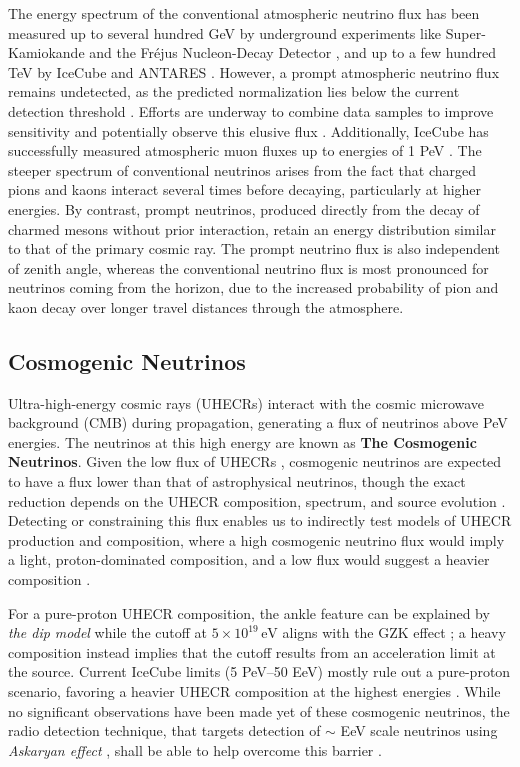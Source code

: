 The energy spectrum of the conventional atmospheric neutrino flux has been measured up to several hundred GeV by underground experiments like Super-Kamiokande  and the Fréjus Nucleon-Decay Detector , and up to a few hundred TeV by IceCube  and ANTARES . However, a prompt atmospheric neutrino flux remains undetected, as the predicted normalization lies below the current detection threshold . Efforts are underway to combine data samples to improve sensitivity and potentially observe this elusive flux . Additionally, IceCube has successfully measured atmospheric muon fluxes up to energies of 1 PeV . The steeper spectrum of conventional neutrinos arises from the fact that charged pions and kaons interact several times before decaying, particularly at higher energies. By contrast, prompt neutrinos, produced directly from the decay of charmed mesons without prior interaction, retain an energy distribution similar to that of the primary cosmic ray. The prompt neutrino flux is also independent of zenith angle, whereas the conventional neutrino flux is most pronounced for neutrinos coming from the horizon, due to the increased probability of pion and kaon decay over longer travel distances through the atmosphere.


\subsection{Cosmogenic Neutrinos}
\label{sec:cosmogenic_nu}
Ultra-high-energy cosmic rays (UHECRs) interact with the cosmic microwave background (CMB) during propagation, generating a flux of neutrinos above PeV energies. The neutrinos at this high energy are known as \textbf{The Cosmogenic Neutrinos}. Given the low flux of UHECRs , cosmogenic neutrinos are expected to have a flux lower than that of astrophysical neutrinos, though the exact reduction depends on the UHECR composition, spectrum, and source evolution . Detecting or constraining this flux enables us to indirectly test models of UHECR production and composition, where a high cosmogenic neutrino flux would imply a light, proton-dominated composition, and a low flux would suggest a heavier composition .

For a pure-proton UHECR composition, the ankle feature can be explained by \emph{the dip model}  while the cutoff at \(5 \times 10^{19} \, \text{eV}\) aligns with the GZK effect ; a heavy composition instead implies that the cutoff results from an acceleration limit at the source. Current IceCube limits (5 PeV–50 EeV) mostly rule out a pure-proton scenario, favoring a heavier UHECR composition at the highest energies . While no significant observations have been made yet of these cosmogenic neutrinos, the radio detection technique, that targets detection of $\sim$ EeV scale neutrinos using \emph{Askaryan effect} , shall be able to help overcome this barrier . 

